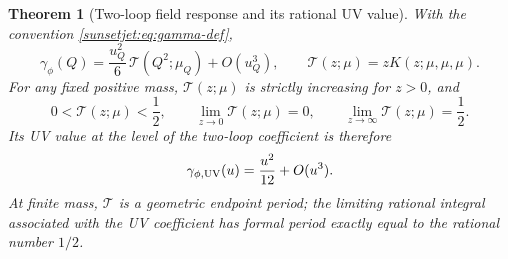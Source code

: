 \documentclass[11pt,a4paper,oneside]{article}
\theoremstyle{plain}
\newtheorem{theorem}{Theorem}[section]
\theoremstyle{definition}
\theoremstyle{remark}
\numberwithin{equation}{section}
\begin{document}
\begin{theorem}[Two-loop field response and its rational UV value]\label{sunsetjet:thm:gamma}
With the convention \eqref{sunsetjet:eq:gamma-def},
\begin{equation}\label{sunsetjet:eq:gamma}
 \gamma_\phi(Q)=\frac{u_Q^2}{6}\,\mathcal T(Q^2;\mu_Q)+O(u_Q^3),
 \qquad
 \mathcal T(z;\mu)=zK(z;\mu,\mu,\mu).
\end{equation}
For any fixed positive mass, $\mathcal T(z;\mu)$ is strictly increasing for $z>0$, and
\begin{equation}\label{sunsetjet:eq:threshold}
 0<\mathcal T(z;\mu)<\frac12,\qquad
 \lim_{z\to0}\mathcal T(z;\mu)=0,\qquad
 \lim_{z\to\infty}\mathcal T(z;\mu)=\frac12.
\end{equation}
Its UV value at the level of the two-loop coefficient is therefore
\begin{equation}\label{sunsetjet:eq:uvgamma}
 \gamma_{\phi,\rm UV}(u)=\frac{u^2}{12}+O(u^3).
\end{equation}
At finite mass, $\mathcal T$ is a geometric endpoint period;
the limiting rational integral associated with the UV coefficient has formal period exactly equal to the rational number $1/2$.
\end{theorem}
\end{document}
